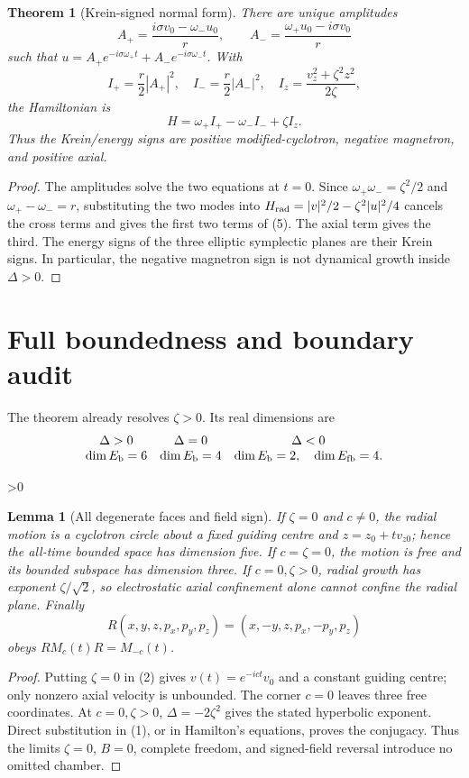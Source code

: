 \documentclass[10pt]{article}
\providecommand{\CRevisionRound}{2}
\newtheorem{theorem}{Theorem}
\newtheorem{lemma}{Lemma}
\begin{document}
\begin{theorem}[Krein-signed normal form]
There are unique amplitudes
\[
 A_+=\frac{i\sigma v_0-\omega_-u_0}{r},\qquad
 A_-=\frac{\omega_+u_0-i\sigma v_0}{r}
\]
such that
$u=A_+e^{-i\sigma\omega_+t}+A_-e^{-i\sigma\omega_-t}$.  With
\[
 I_+=\frac r2|A_+|^2,\quad I_-=\frac r2|A_-|^2,\quad
 I_z=\frac{v_z^2+\zeta^2z^2}{2\zeta},
\]
the Hamiltonian is
\begin{equation}
 H=\omega_+I_+-\omega_-I_-+\zeta I_z. \tag{5}
\end{equation}
Thus the Krein/energy signs are positive modified-cyclotron, negative
magnetron, and positive axial.
\end{theorem}

\begin{proof}
The amplitudes solve the two equations at $t=0$.  Since
$\omega_+\omega_-=\zeta^2/2$ and $\omega_+-\omega_-=r$, substituting the two
modes into
$H_{\rm rad}=|v|^2/2-\zeta^2|u|^2/4$ cancels the cross terms and gives the
first two terms of (5).  The axial term gives the third.  The energy signs of
the three elliptic symplectic planes are their Krein signs.  In particular,
the negative magnetron sign is not dynamical growth inside $\Delta>0$.
\end{proof}

\section{Full boundedness and boundary audit}
The theorem already resolves $\zeta>0$.  Its real dimensions are
\[
\begin{array}{c@{\quad}c@{\quad}c}
\Delta>0&\Delta=0&\Delta<0\\
\dim E_{\rm b}=6&\dim E_{\rm b}=4&\dim E_{\rm b}=2,\quad
\dim E_{\rm fb}=4.
\end{array}
\]

\ifnum\CRevisionRound>0
\begin{lemma}[All degenerate faces and field sign]
If $\zeta=0$ and $c\ne0$, the radial motion is a cyclotron circle about a fixed
guiding centre and $z=z_0+t v_{z0}$; hence the all-time bounded space has
dimension five.  If $c=\zeta=0$, the motion is free and its bounded subspace has
dimension three.  If $c=0,\zeta>0$, radial growth has exponent
$\zeta/\sqrt2$, so electrostatic axial confinement alone cannot confine the
radial plane.  Finally
\[
 R(x,y,z,p_x,p_y,p_z)=(x,-y,z,p_x,-p_y,p_z)
\]
obeys $RM_c(t)R=M_{-c}(t)$.
\end{lemma}
\begin{proof}
Putting $\zeta=0$ in (2) gives $v(t)=e^{-ict}v_0$ and a constant guiding
centre; only nonzero axial velocity is unbounded.  The corner $c=0$ leaves
three free coordinates.  At $c=0,\zeta>0$, $\Delta=-2\zeta^2$ gives the stated
hyperbolic exponent.  Direct substitution in (1), or in Hamilton's equations,
proves the conjugacy.  Thus the limits $\zeta=0$, $B=0$, complete freedom, and
signed-field reversal introduce no omitted chamber.
\end{proof}
\end{document}
